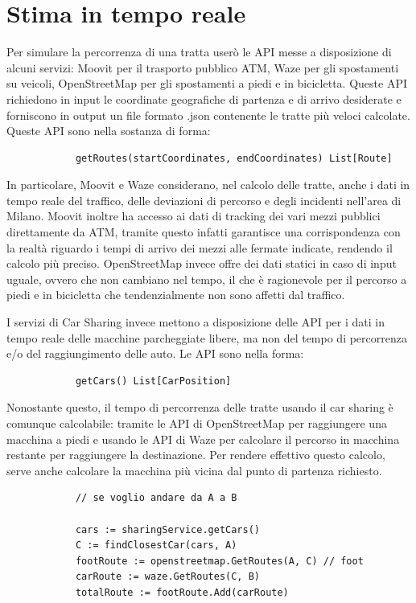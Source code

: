 \documentclass[a4paper]{report}
\begin{document}
	\section{Stima in tempo reale}
	{\large
		Per simulare la percorrenza di una tratta userò le API messe a disposizione di alcuni servizi: Moovit per il trasporto pubblico ATM, Waze per gli spostamenti su veicoli, OpenStreetMap per gli spostamenti a piedi e in bicicletta. Queste API richiedono in input le coordinate geografiche di partenza e di arrivo desiderate e forniscono in output un file formato .json contenente le tratte più veloci calcolate. Queste API sono nella sostanza di forma:
		\begin{verbatim}
			getRoutes(startCoordinates, endCoordinates) List[Route]
		\end{verbatim}
	}

	{\large
		In particolare, Moovit e Waze considerano, nel calcolo delle tratte, anche i dati in tempo reale del traffico, delle deviazioni di percorso e degli incidenti nell'area di Milano. Moovit inoltre ha accesso ai dati di tracking dei vari mezzi pubblici direttamente da ATM, tramite questo infatti garantisce una corrispondenza con la realtà riguardo i tempi di arrivo dei mezzi alle fermate indicate, rendendo il calcolo più preciso. OpenStreetMap invece offre dei dati statici in caso di input uguale, ovvero che non cambiano nel tempo, il che è ragionevole per il percorso a piedi e in bicicletta che tendenzialmente non sono affetti dal traffico.
	}

	{\large
		I servizi di Car Sharing invece mettono a disposizione delle API per i dati in tempo reale delle macchine parcheggiate libere, ma non del tempo di percorrenza e/o del raggiungimento delle auto. Le API sono nella forma:
		\begin{verbatim}
			getCars() List[CarPosition]
		\end{verbatim}
	}
	
	{\large
		Nonostante questo, il tempo di percorrenza delle tratte usando il car sharing è comunque calcolabile: tramite le API di OpenStreetMap per raggiungere una macchina a piedi e usando le API di Waze per calcolare il percorso in macchina restante per raggiungere la destinazione. Per rendere effettivo questo calcolo, serve anche calcolare la macchina più vicina dal punto di partenza richiesto.
		\begin{verbatim}
			// se voglio andare da A a B

			cars := sharingService.getCars()
			C := findClosestCar(cars, A)
			footRoute := openstreetmap.GetRoutes(A, C) // foot
			carRoute := waze.GetRoutes(C, B)
			totalRoute := footRoute.Add(carRoute)
		\end{verbatim}
	}
\end{document}
